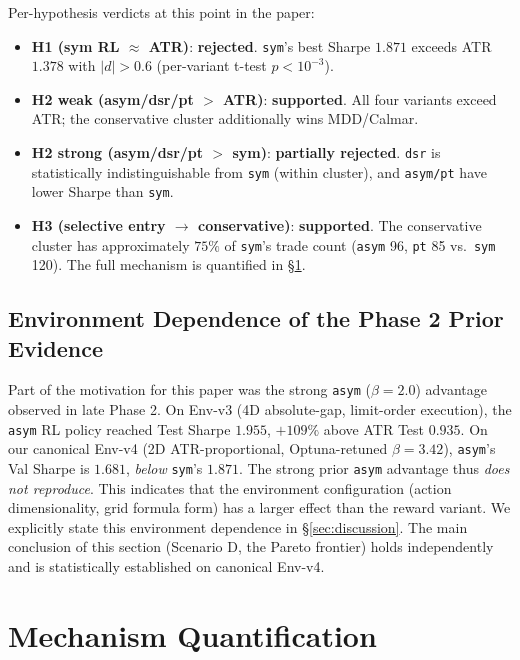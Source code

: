 \documentclass[11pt, a4paper]{article}
\begin{document}
Per-hypothesis verdicts at this point in the paper:
\begin{itemize}[leftmargin=*]
\item \textbf{H1 (sym RL $\approx$ ATR)}: \textbf{rejected}. \texttt{sym}'s
best Sharpe $1.871$ exceeds ATR $1.378$ with $|d| > 0.6$
(per-variant t-test $p < 10^{-3}$).
\item \textbf{H2 weak (asym/dsr/pt $>$ ATR)}: \textbf{supported}. All four
variants exceed ATR; the conservative cluster additionally wins MDD/Calmar.
\item \textbf{H2 strong (asym/dsr/pt $>$ sym)}: \textbf{partially rejected}.
\texttt{dsr} is statistically indistinguishable from \texttt{sym} (within
cluster), and \texttt{asym/pt} have lower Sharpe than \texttt{sym}.
\item \textbf{H3 (selective entry $\to$ conservative)}: \textbf{supported}.
The conservative cluster has approximately $75\%$ of \texttt{sym}'s trade
count (\texttt{asym} 96, \texttt{pt} 85 vs.\ \texttt{sym} 120). The full
mechanism is quantified in \S\ref{sec:mechanism}.
\end{itemize}

\subsection{Environment Dependence of the Phase 2 Prior Evidence}
\label{sec:pareto_env_dependence}

Part of the motivation for this paper was the strong \texttt{asym}
($\beta=2.0$) advantage observed in late Phase 2. On Env-v3
(4D absolute-gap, limit-order execution), the \texttt{asym} RL policy
reached Test Sharpe $1.955$, $+109\%$ above ATR Test $0.935$. On our
canonical Env-v4 (2D ATR-proportional, Optuna-retuned $\beta=3.42$),
\texttt{asym}'s Val Sharpe is $1.681$, \emph{below} \texttt{sym}'s $1.871$.
The strong prior \texttt{asym} advantage thus \emph{does not reproduce}.
This indicates that the environment configuration (action dimensionality,
grid formula form) has a larger effect than the reward variant. We explicitly
state this environment dependence in \S\ref{sec:discussion}. The main
conclusion of this section (Scenario D, the Pareto frontier) holds
independently and is statistically established on canonical Env-v4.

\section{Mechanism Quantification}
\label{sec:mechanism}
\end{document}

